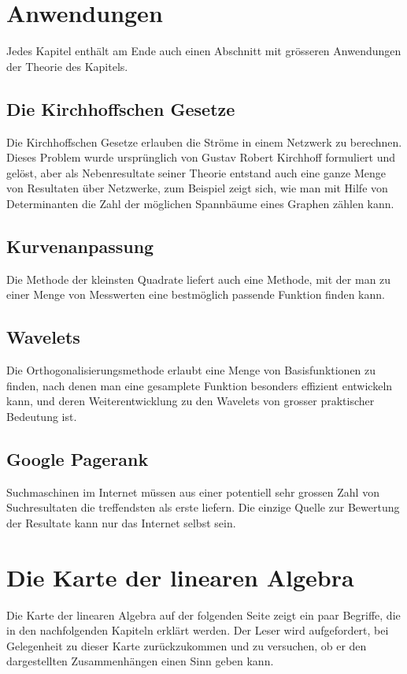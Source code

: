 \section*{Anwendungen}
Jedes Kapitel enthält am Ende auch einen Abschnitt mit grösseren
Anwendungen der Theorie des Kapitels.

\subsection*{Die Kirchhoffschen Gesetze}
Die Kirchhoffschen Gesetze erlauben die Ströme in einem Netzwerk
zu berechnen.
Dieses Problem wurde ursprünglich von Gustav Robert Kirchhoff
formuliert und gelöst, aber als Nebenresultate seiner Theorie
entstand auch eine ganze Menge von Resultaten über Netzwerke,
zum Beispiel zeigt sich, wie man mit Hilfe von Determinanten
die Zahl der möglichen Spannbäume eines Graphen zählen kann.

\subsection*{Kurvenanpassung}
Die Methode der kleinsten Quadrate liefert auch eine Methode,
mit der man zu einer Menge von Messwerten eine bestmöglich passende
Funktion finden kann.

\subsection*{Wavelets}
Die Orthogonalisierungsmethode erlaubt eine Menge von
Basisfunktionen zu finden, nach denen man eine gesamplete Funktion
besonders effizient entwickeln kann, und deren Weiterentwicklung
zu den Wavelets von grosser praktischer Bedeutung ist.

\subsection*{Google Pagerank}
Suchmaschinen im Internet müssen aus einer potentiell sehr grossen Zahl
von Suchresultaten die treffendsten als erste liefern.
Die einzige Quelle zur Bewertung der Resultate kann nur
das Internet selbst sein.

\section*{Die Karte der linearen Algebra}
Die Karte der linearen Algebra auf der folgenden Seite zeigt ein
paar Begriffe, die in den nachfolgenden Kapiteln erklärt werden.
Der Leser wird aufgefordert, bei Gelegenheit zu dieser Karte
zurückzukommen und zu versuchen, ob er den dargestellten
Zusammenhängen einen Sinn geben kann.

